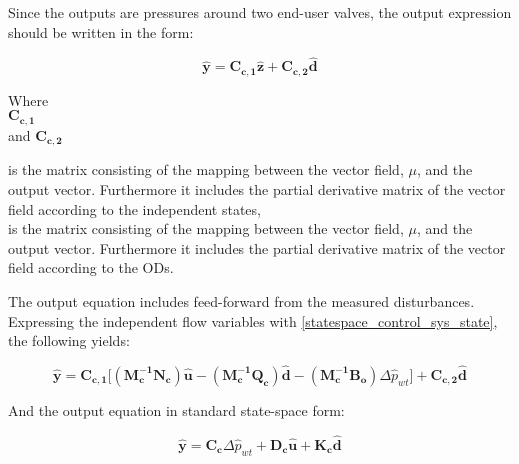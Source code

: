 Since the outputs are pressures around two end-user valves, the output expression should be written in the form:

\begin{equation}
  \bm{\hat{y}} = \bm{C_{c,1}} \bm{\hat{z}} + \bm{C_{c,2}} \bm{\hat{d}}  
   \label{statespace_control_output}
\end{equation}

\begin{minipage}[t]{0.20\textwidth}
Where\\
\hspace*{8mm} $\bm{C_{c,1}}$ \\
\newline
\newline
and \hspace*{0.7mm} $\bm{C_{c,2}}$ 
\end{minipage}
\begin{minipage}[t]{0.78\textwidth}
\vspace*{2mm}
is the matrix consisting of the mapping between the vector field, $\mu$, and the output vector. Furthermore it includes the partial derivative matrix of the vector field according to the independent states, \\
is the matrix consisting of the mapping between the vector field, $\mu$, and the output vector. Furthermore it includes the partial derivative matrix of the vector field according to the ODs.
\end{minipage}

The output equation includes feed-forward from the measured disturbances. 
\\
Expressing the independent flow variables with \eqref{statespace_control_sys_state}, the following yields: 

\begin{equation}
  \bm{\hat{y}} = \bm{C_{c,1}} \big[ (\bm{M_c^{-1}}\bm{N_c}) \bm{\hat{u}} - (\bm{M_c^{-1}}\bm{Q_c}) \bm{\hat{d}} - (\bm{M_c^{-1}}\bm{B_o}) \Delta \hat{p}_{wt}\big] + \bm{C_{c,2}} \bm{\hat{d}}  
   \label{statespace_control_output}
\end{equation}

And the output equation in standard state-space form:

\begin{equation}
  \bm{\hat{y}} = \bm{C_c} \Delta \hat{p}_{wt} + \bm{D_c} \bm{\hat{u}} + \bm{K_c} \bm{\hat{d}}
\label{statespace_control_output_standard}
\end{equation}

